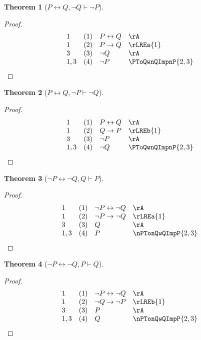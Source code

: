 \documentclass{book}
\theoremstyle{plain}
\newtheorem{theorem}{Theorem}
\theoremstyle{remark}
\theoremstyle{definition}
\begin{document}
\label{PLrQwnQImpnP}
\begin{theorem}[\(P \leftrightarrow Q, \neg Q \vdash \neg P\)]
\end{theorem}
\begin{proof}		
	\[
	\begin{array}{llll}
		1 & (1) & P \leftrightarrow Q &\rA \\
		1 & (2) & P\rightarrow Q & \rLREa{1} \\
		3 & (3) & \neg Q & \rA \\
		1,3 & (4) & \neg P & \PToQwnQImpnP{2,3} \\
	\end{array}
	\]
\end{proof}

\label{PLrQwnPImpnQ}
\begin{theorem}[\(P \leftrightarrow Q, \neg P \vdash \neg Q\)]
\end{theorem}
\begin{proof}		
	\[
	\begin{array}{llll}
		1 & (1) & P \leftrightarrow Q & \rA \\
		1 & (2) & Q\rightarrow P & \rLREb{1} \\
		3 & (3) & \neg P & \rA \\
		1,3 & (4) & \neg Q & \PToQwnQImpnP{2,3} \\
	\end{array}
	\]
\end{proof}


\label{nPLrnQwQImpP}
\begin{theorem}[\(\neg P \leftrightarrow \neg Q, Q \vdash P\)]
\end{theorem}
\begin{proof}		
	\[
	\begin{array}{llll}
		1 & (1) & \neg P \leftrightarrow \neg Q & \rA \\
		1 & (2) & \neg P\rightarrow \neg Q & \rLREa{1} \\
		3 & (3) & Q & \rA \\
		1,3 & (4) & P & \nPTonQwQImpP{2,3} \\
	\end{array}
	\]
\end{proof}


\label{nPLrnQwPImpQ}
\begin{theorem}[\(\neg P \leftrightarrow \neg Q, P \vdash Q\)]
\end{theorem}
\begin{proof}		
	\[
	\begin{array}{llll}
		1 & (1) & \neg P \leftrightarrow \neg Q & \rA \\
		1 & (2) & \neg Q\rightarrow \neg P & \rLREb{1} \\
		3 & (3) & P & \rA \\
		1,3 & (4) & Q & \nPTonQwQImpP{2,3} \\
	\end{array}
	\]
\end{proof}
\end{document}
